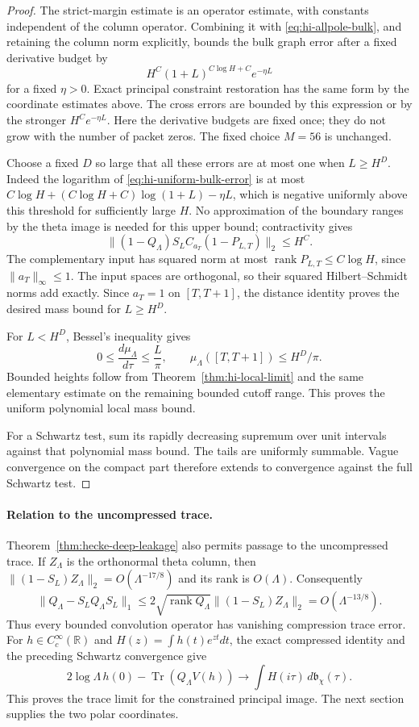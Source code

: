 \begin{proof}
The strict-margin estimate is an operator estimate, with constants
independent of the column operator. Combining it with
\eqref{eq:hi-allpole-bulk}, and retaining the column norm explicitly,
bounds the bulk graph error after a fixed derivative budget by
\begin{equation}\label{eq:hi-uniform-bulk-error}
                 H^C(1+L)^{C\log H+C}e^{-\eta L}
\end{equation}
for a fixed $\eta>0$. Exact principal constraint restoration has the
same form by the coordinate estimates above. The cross errors are bounded
by this expression or by the stronger $H^Ce^{-\eta L}$.
Here the derivative budgets are fixed once; they do not grow with the
number of packet zeros. The fixed choice $M=56$ is unchanged.

Choose a fixed $D$ so large that all these errors are at most one when
$L\ge H^D$. Indeed the logarithm of \eqref{eq:hi-uniform-bulk-error}
is at most $C\log H+(C\log H+C)\log(1+L)-\eta L$, which is negative
uniformly above this threshold for sufficiently large $H$.
No approximation of the boundary ranges by the theta image is needed
for this upper bound; contractivity gives
\[
       \|(1-Q_\Lambda)S_LC_{a_T}(1-P_{L,T})\|_2\le H^C.
\]
The complementary input has squared norm at most
$\operatorname{rank}P_{L,T}\le C\log H$, since $\|a_T\|_\infty\le1$.
The input spaces are orthogonal, so their squared Hilbert--Schmidt norms
add exactly. Since $a_T=1$ on $[T,T+1]$, the distance identity proves the
desired mass bound for $L\ge H^D$.

For $L<H^D$, Bessel's inequality gives
\[
 0\le\frac{d\mu_\Lambda}{d\tau}\le\frac L\pi,
 \qquad \mu_\Lambda([T,T+1])\le H^D/\pi.
\]
Bounded heights follow from Theorem~\ref{thm:hi-local-limit} and the
same elementary estimate on the remaining bounded cutoff range.
This proves the uniform polynomial local mass bound.

For a Schwartz test, sum its rapidly decreasing supremum over unit
intervals against that polynomial mass bound. The tails are uniformly
summable. Vague convergence on the compact part therefore extends to
convergence against the full Schwartz test.
\end{proof}

\paragraph{Relation to the uncompressed trace.}
Theorem~\ref{thm:hecke-deep-leakage} also permits passage to the
uncompressed trace. If $Z_\Lambda$ is
the orthonormal theta column, then
$\|(1-S_L)Z_\Lambda\|_2=O(\Lambda^{-17/8})$ and its rank is
$O(\Lambda)$. Consequently
\[
 \|Q_\Lambda-S_LQ_\Lambda S_L\|_1
 \le2\sqrt{\operatorname{rank}Q_\Lambda}
                 \|(1-S_L)Z_\Lambda\|_2
                      =O(\Lambda^{-13/8}).
\]
Thus every bounded convolution operator has vanishing compression trace
error. For $h\in C_c^\infty(\mathbb R)$ and
$H(z)=\int h(t)e^{zt}dt$, the exact compressed identity and the preceding
Schwartz convergence give
\[
 2\log\Lambda\,h(0)-\operatorname{Tr}(Q_\Lambda V(h))
       \longrightarrow\int H(i\tau)\,d\mathfrak b_\chi(\tau).
\]
This proves the trace limit for the constrained principal image.
The next section supplies the two polar coordinates.
